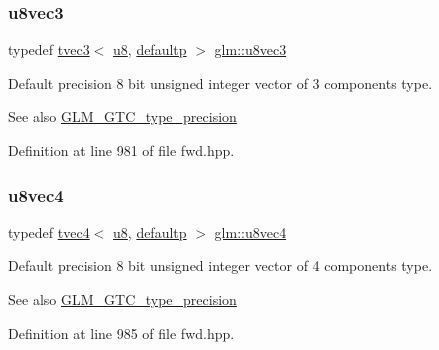 \subsubsection{\texorpdfstring{u8vec3}{u8vec3}}
{\footnotesize\ttfamily typedef \mbox{\hyperlink{structglm_1_1tvec3}{tvec3}}$<$ \mbox{\hyperlink{group__gtc__type__precision_ga5e3dc67373d5068997d2d9f41c9024d2}{u8}}, \mbox{\hyperlink{namespaceglm_a0f04f086094c747d227af4425893f545a9d21ccd8b5a009ec7eb7677befc3bf51}{defaultp}} $>$ \mbox{\hyperlink{group__gtc__type__precision_ga8262aeb120701de1b57773eb10be0f35}{glm\+::u8vec3}}}

Default precision 8 bit unsigned integer vector of 3 components type. \begin{DoxySeeAlso}{See also}
\mbox{\hyperlink{group__gtc__type__precision}{G\+L\+M\+\_\+\+G\+T\+C\+\_\+type\+\_\+precision}} 
\end{DoxySeeAlso}


Definition at line 981 of file fwd.\+hpp.

\mbox{\label{group__gtc__type__precision_gaf3c840b8a90a194559121504ba599197}} 
\subsubsection{\texorpdfstring{u8vec4}{u8vec4}}
{\footnotesize\ttfamily typedef \mbox{\hyperlink{structglm_1_1tvec4}{tvec4}}$<$ \mbox{\hyperlink{group__gtc__type__precision_ga5e3dc67373d5068997d2d9f41c9024d2}{u8}}, \mbox{\hyperlink{namespaceglm_a0f04f086094c747d227af4425893f545a9d21ccd8b5a009ec7eb7677befc3bf51}{defaultp}} $>$ \mbox{\hyperlink{group__gtc__type__precision_gaf3c840b8a90a194559121504ba599197}{glm\+::u8vec4}}}

Default precision 8 bit unsigned integer vector of 4 components type. \begin{DoxySeeAlso}{See also}
\mbox{\hyperlink{group__gtc__type__precision}{G\+L\+M\+\_\+\+G\+T\+C\+\_\+type\+\_\+precision}} 
\end{DoxySeeAlso}


Definition at line 985 of file fwd.\+hpp.

\mbox{\label{group__gtc__type__precision_gad8c2939e1fdd8e5828b31d95c52255d5}} 
